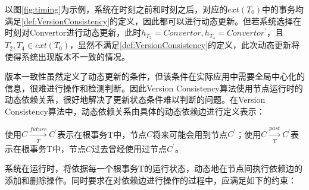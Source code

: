 \documentclass[macfonts,master]{njuthesis}
\begin{document}
以图\ref{fig:timing}为示例，系统在时刻之前和时刻之后，对应的$ext(T_0)$中的事务均满足\ref{def:VersionConsistency}的定义，因此都可以进行动态更新。但若系统选择在时刻对Convertor进行动态更新，此时$h_{T_2} = Convertor,h_{T_4} = Convertor^{'}$，且$T_2,T_4 \in ext(T_0)$，显然不满足\ref{def:VersionConsistency}的定义，此次动态更新将使得系统出现版本不一致的情况。

版本一致性虽然定义了动态更新的条件，但该条件在实际应用中需要全局中心化的信息，很难进行操作和检测判断。因此Version Consistency算法使用节点运行时的动态依赖关系，很好地解决了更新状态条件难以判断的问题。在Version Consistency算法中，动态依赖关系由具体的动态依赖边进行定义表示：

\begin{definition}[动态依赖边]\label{def:DynamicDep}
使用$C\xrightarrow[T]{future} C^{'}$表示在根事务T中，节点$C$将来可能会用到节点$C^{'}$；使用$C\xrightarrow[T]{past} C^{'}$表示在根事务T中，节点$C$过去曾经使用过节点$C^{'}$。
\end{definition}

系统在运行时，将依据每一个根事务T的运行状态，动态地在节点间执行依赖边的添加和删除操作。同时要求在对依赖边进行操作的过程中，应满足如下的约束：
\end{document}
